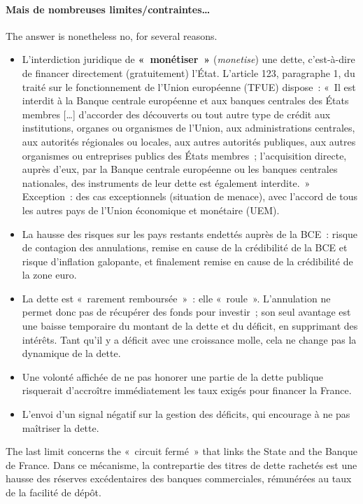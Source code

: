 \paragraph{Mais de nombreuses limites/contraintes…}
The answer is nonetheless no, for several reasons.
\begin{itemize}
  \item L'interdiction juridique de \textbf{«~monétiser~»}
    (\textit{monetise}) une dette, c'est-à-dire de financer directement
    (gratuitement) l'État. L'article 123, paragraphe 1, du traité sur le
    fonctionnement de l'Union européenne (TFUE) dispose~: «~Il est interdit à la
    Banque centrale européenne et aux banques centrales des États membres […]
    d'accorder des découverts ou tout autre type de crédit aux institutions,
    organes ou organismes de l'Union, aux administrations centrales, aux
    autorités régionales ou locales, aux autres autorités publiques, aux autres
    organismes ou entreprises publics des États membres~; l'acquisition directe,
    auprès d'eux, par la Banque centrale européenne ou les banques centrales
    nationales, des instruments de leur dette est également interdite.~»
    Exception~: des cas exceptionnels (situation de menace), avec l'accord de
    tous les autres pays de l'Union économique et monétaire (UEM).
  \item La hausse des risques sur les pays restants endettés auprès de la BCE~:
    risque de contagion des annulations, remise en cause de la crédibilité de la
    BCE et risque d'inflation galopante, et finalement remise en cause de la
    crédibilité de la zone euro.
  \item La dette est «~rarement remboursée~»~: elle «~roule~». L'annulation ne
    permet donc pas de récupérer des fonds pour investir~; son seul avantage est
    une baisse temporaire du montant de la dette et du déficit, en supprimant des
    intérêts. Tant qu'il y a déficit avec une croissance molle, cela ne change
    pas la dynamique de la dette.
  \item Une volonté affichée de ne pas honorer une partie de la dette publique
    risquerait d'accroître immédiatement les taux exigés pour financer la
    France.
  \item L'envoi d'un signal négatif sur la gestion des déficits, qui encourage à
    ne pas maîtriser la dette.
\end{itemize}

The last limit concerns the «~circuit fermé~» that links the State and the
Banque de France. Dans ce mécanisme, la contrepartie des titres de dette
rachetés est une hausse des réserves excédentaires des banques commerciales,
rémunérées au taux de la facilité de dépôt.

